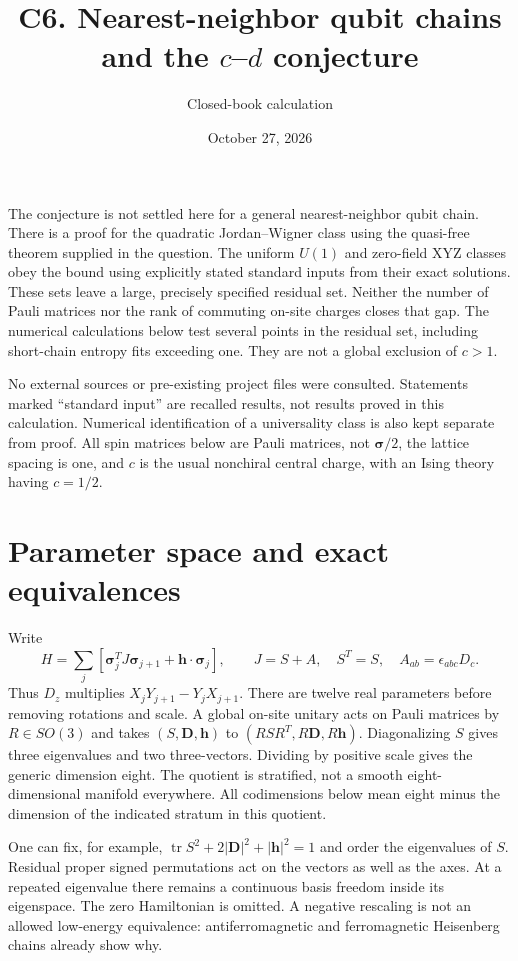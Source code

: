 \documentclass[11pt]{article}
\title{C6. Nearest-neighbor qubit chains and the $c$--$d$ conjecture}
\author{Closed-book calculation}
\date{October 27, 2026}
\newcommand{\DD}{\boldsymbol D}
\newcommand{\hh}{\boldsymbol h}
\newcommand{\ssigma}{\boldsymbol\sigma}
\begin{document}
\maketitle

The conjecture is not settled here for a general nearest-neighbor qubit chain.
There is a proof for the quadratic Jordan--Wigner class using the quasi-free
theorem supplied in the question. The uniform $U(1)$ and zero-field XYZ classes
obey the bound using explicitly stated standard inputs from their exact
solutions. These sets leave a large, precisely specified residual set. Neither
the number of Pauli matrices nor the rank of commuting on-site charges closes
that gap. The numerical calculations below test several points in the residual
set, including short-chain entropy fits exceeding one. They are not a global
exclusion of $c>1$.

No external sources or pre-existing project files were consulted. Statements
marked ``standard input'' are recalled results, not results proved in this
calculation. Numerical identification of a universality class is also kept
separate from proof. All spin matrices below are Pauli matrices, not
$\ssigma/2$, the lattice spacing is one, and $c$ is the usual nonchiral central
charge, with an Ising theory having $c=1/2$.

\section{Parameter space and exact equivalences}

Write
\begin{equation}
 H=\sum_j\left[\ssigma_j^T J\ssigma_{j+1}+\hh\cdot\ssigma_j\right],
 \qquad J=S+A,\quad S^T=S,\quad A_{ab}=\epsilon_{abc}D_c.
 \label{eq:H}
\end{equation}
Thus $D_z$ multiplies $X_jY_{j+1}-Y_jX_{j+1}$. There are twelve real parameters
before removing rotations and scale. A global on-site unitary acts on Pauli
matrices by $R\in SO(3)$ and takes $(S,\DD,\hh)$ to
$(RSR^T,R\DD,R\hh)$. Diagonalizing $S$ gives three eigenvalues and two
three-vectors. Dividing by positive scale gives the generic dimension eight.
The quotient is stratified, not a smooth eight-dimensional manifold everywhere.
All codimensions below mean eight minus the dimension of the indicated stratum
in this quotient.

One can fix, for example,
$\operatorname{tr}S^2+2|\DD|^2+|\hh|^2=1$ and order the eigenvalues of $S$.
Residual proper signed permutations act on the vectors as well as the axes.
At a repeated eigenvalue there remains a continuous basis freedom inside its
eigenspace. The zero Hamiltonian is omitted. A negative rescaling is not an
allowed low-energy equivalence: antiferromagnetic and ferromagnetic Heisenberg
chains already show why.
\end{document}
